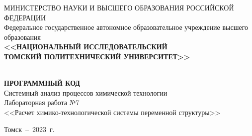 \begin{titlepage}
	\begin{center}
\sffamily	\small{\MakeUppercase {Министерство науки и высшего образования
			Российской Федерации}}\\
		\footnotesize {Федеральное государственное автономное образовательное учреждение  высшего образования}\\
	\small	\MakeTextUppercase{\textbf{<<Национальный исследовательский} \\ \textbf{Томский политехнический университет>>}} \\
		\hrulefill
		\\[4cm]


		\bigskip

		{
			\Large \MakeUppercase{\textbf{Программный код}} \\

			Системный анализ процессов химической технологии \\
			Лабораторная работа №7 \\
			<<Расчет химико-технологической системы переменной структуры>>
			\
			 \bigskip



		}

\vspace{0.1\textheight}
\begin{minipage}{0.46\linewidth}
	\hfil
\end{minipage}



		\vfill
		Томск~--~2023~г.
	\end{center}

\end{titlepage}